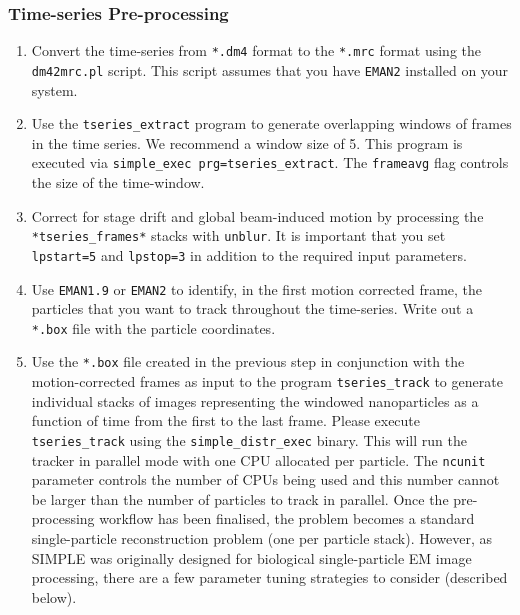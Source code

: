 \documentclass[a4paper,11pt]{article}
\newcommand{\prgname}[1]{\textcolor{NavyBlue}{\texttt{#1}}}
\begin{document}
\subsubsection{Time-series Pre-processing}
\begin{enumerate}
\item Convert the time-series from \texttt{*.dm4} format to the \texttt{*.mrc} format using the \prgname{dm42mrc.pl} script. This script assumes that you have \texttt{EMAN2} installed on your system.
\item Use the \prgname{tseries\_extract} program to generate overlapping windows of frames in the time series. We recommend a window size of 5. This program is executed via \texttt{simple\_exec prg=tseries\_extract}. The \texttt{frameavg} flag controls the size of the time-window.
\item Correct for stage drift and global beam-induced motion by processing the \texttt{*tseries\_frames*} stacks with \prgname{unblur}. It is important that you set \texttt{lpstart=5} and \texttt{lpstop=3} in addition to the required input parameters.
\item Use \texttt{EMAN1.9} or \texttt{EMAN2} to identify, in the first motion corrected frame, the particles that you want to track throughout the time-series. Write out a \texttt{*.box} file with the particle coordinates.
\item Use the \texttt{*.box} file created in the previous step in conjunction with the motion-corrected frames as input to the program \prgname{tseries\_track} to generate individual stacks of images representing the windowed nanoparticles as a function of time from the first to the last frame. Please execute \prgname{tseries\_track} using the \texttt{simple\_distr\_exec} binary. This will run the tracker in parallel mode with one CPU allocated per particle. The \texttt{ncunit} parameter controls the number of CPUs being used and this number cannot be larger than the number of particles to track in parallel.
Once the pre-processing workflow has been finalised, the problem becomes a standard single-particle reconstruction problem (one per particle stack). However, as SIMPLE was originally designed for biological single-particle EM image processing, there are a few parameter tuning strategies to consider (described below).
\end{enumerate}

\def\bibfont{\footnotesize}


\end{document}
